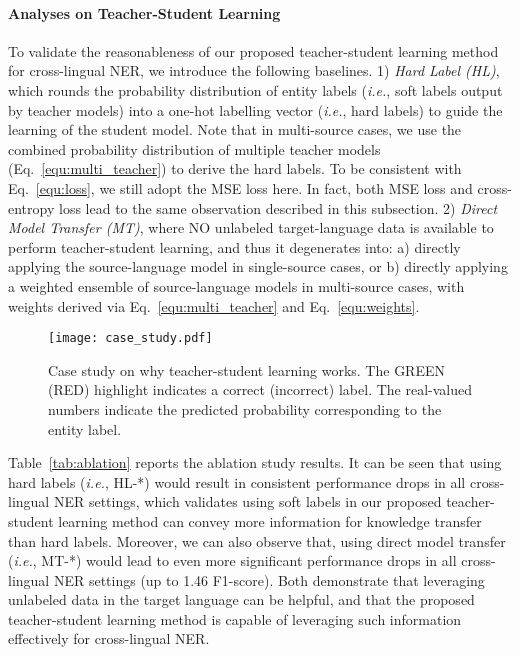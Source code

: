 \documentclass[11pt,a4paper]{article}
\newcommand\ie{\textit{i.e.}}
\begin{document}
	\paragraph{Analyses on Teacher-Student Learning}
	To validate the reasonableness of our proposed teacher-student learning method for cross-lingual NER, we introduce the following baselines. 
	1)  \emph{Hard Label (HL)}, which rounds the probability distribution of entity labels (\ie, soft labels output by teacher models) into a one-hot labelling vector (\ie, hard labels) to guide the learning of the student model. Note that in multi-source cases, we use the combined probability distribution of multiple teacher models (Eq.~\ref{equ:multi_teacher}) to derive the hard labels. 
	To be consistent with Eq.~\ref{equ:loss}, we still adopt the MSE loss here. In fact, both MSE loss and cross-entropy loss lead to the same observation described in this subsection.
	2) \emph{Direct Model Transfer (MT)}, where NO unlabeled target-language data is available to perform teacher-student learning, and thus it degenerates into: a) directly applying the source-language model in single-source cases, or b) directly applying a weighted ensemble of source-language models in multi-source cases, with weights derived via Eq.~\ref{equ:multi_teacher} and Eq.~\ref{equ:weights}.
	
	\begin{figure*}[t]
		\centering
		\texttt{[image: case\_study.pdf]}
		\caption{Case study on why teacher-student learning works. The \colorbox[rgb]{0.80, 0.98, 0.85}{GREEN} (\colorbox[rgb]{0.97, 0.82, 0.80}{RED}) highlight indicates a correct (incorrect) label. The real-valued numbers indicate the predicted probability corresponding to the entity label.}
		\label{fig:case_study}
	\end{figure*}

	Table~\ref{tab:ablation} reports the ablation study results. It can be seen that using hard labels (\ie, HL-*) would result in consistent performance drops in all cross-lingual NER settings, which validates using soft labels in our proposed teacher-student learning method can convey more information for knowledge transfer than hard labels. Moreover, we can also observe that, using direct model transfer (\ie, MT-*) would lead to even more significant performance drops in all cross-lingual NER settings (up to 1.46 F1-score). Both demonstrate that leveraging unlabeled data in the target language can be helpful, and that the proposed teacher-student learning method is capable of leveraging such information effectively for cross-lingual NER.
	
\end{document}
